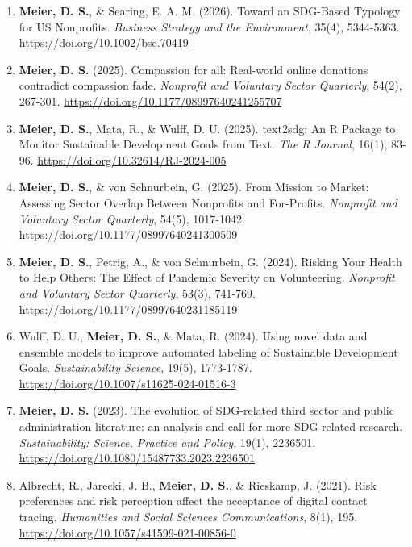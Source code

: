 \documentclass[11pt,letterpaper]{article}
\newcommand{\pubitem}[1]{
    \item #1
}
\begin{document}
\begin{enumerate}[leftmargin=*, itemsep=0.5em]

\pubitem{\textbf{Meier, D. S.}, \& Searing, E. A. M. (2026). Toward an SDG-Based Typology for US Nonprofits. \textit{Business Strategy and the Environment}, 35(4), 5344-5363. \href{https://doi.org/10.1002/bse.70419}{https://doi.org/10.1002/bse.70419}}

\pubitem{\textbf{Meier, D. S.} (2025). Compassion for all: Real-world online donations contradict compassion fade. \textit{Nonprofit and Voluntary Sector Quarterly}, 54(2), 267-301. \href{https://doi.org/10.1177/08997640241255707}{https://doi.org/10.1177/08997640241255707}}

\pubitem{\textbf{Meier, D. S.}, Mata, R., \& Wulff, D. U. (2025). text2sdg: An R Package to Monitor Sustainable Development Goals from Text. \textit{The R Journal}, 16(1), 83-96. \href{https://doi.org/10.32614/RJ-2024-005}{https://doi.org/10.32614/RJ-2024-005}}

\pubitem{\textbf{Meier, D. S.}, \& von Schnurbein, G. (2025). From Mission to Market: Assessing Sector Overlap Between Nonprofits and For-Profits. \textit{Nonprofit and Voluntary Sector Quarterly}, 54(5), 1017-1042. \href{https://doi.org/10.1177/08997640241300509}{https://doi.org/10.1177/08997640241300509}}

\pubitem{\textbf{Meier, D. S.}, Petrig, A., \& von Schnurbein, G. (2024). Risking Your Health to Help Others: The Effect of Pandemic Severity on Volunteering. \textit{Nonprofit and Voluntary Sector Quarterly}, 53(3), 741-769. \href{https://doi.org/10.1177/08997640231185119}{https://doi.org/10.1177/08997640231185119}}

\pubitem{Wulff, D. U., \textbf{Meier, D. S.}, \& Mata, R. (2024). Using novel data and ensemble models to improve automated labeling of Sustainable Development Goals. \textit{Sustainability Science}, 19(5), 1773-1787. \href{https://doi.org/10.1007/s11625-024-01516-3}{https://doi.org/10.1007/s11625-024-01516-3}}

\pubitem{\textbf{Meier, D. S.} (2023). The evolution of SDG-related third sector and public administration literature: an analysis and call for more SDG-related research. \textit{Sustainability: Science, Practice and Policy}, 19(1), 2236501. \href{https://doi.org/10.1080/15487733.2023.2236501}{https://doi.org/10.1080/15487733.2023.2236501}}

\pubitem{Albrecht, R., Jarecki, J. B., \textbf{Meier, D. S.}, \& Rieskamp, J. (2021). Risk preferences and risk perception affect the acceptance of digital contact tracing. \textit{Humanities and Social Sciences Communications}, 8(1), 195. \href{https://doi.org/10.1057/s41599-021-00856-0}{https://doi.org/10.1057/s41599-021-00856-0}}

\end{enumerate}
\end{document}
